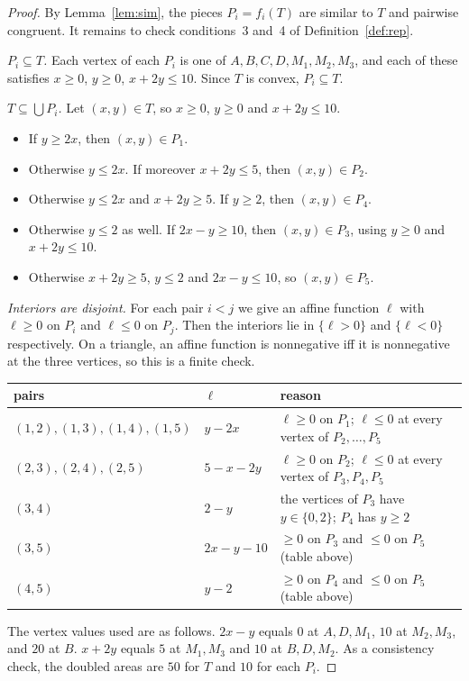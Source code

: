 \documentclass[11pt]{article}
\theoremstyle{definition}
\theoremstyle{remark}
\begin{document}
\begin{proof}
By Lemma~\ref{lem:sim}, the pieces $P_i=f_i(T)$ are similar to $T$ and pairwise
congruent. It remains to check conditions~3 and~4 of Definition~\ref{def:rep}.

\emph{$P_i\subseteq T$.} Each vertex of each $P_i$ is one of $A,B,C,D,M_1,M_2,M_3$, and
each of these satisfies $x\ge0$, $y\ge0$, $x+2y\le10$. Since $T$ is convex, $P_i\subseteq T$.

\emph{$T\subseteq\bigcup P_i$.} Let $(x,y)\in T$, so $x\ge0$, $y\ge0$ and $x+2y\le10$.
\begin{itemize}
\item If $y\ge2x$, then $(x,y)\in P_1$.
\item Otherwise $y\le2x$. If moreover $x+2y\le5$, then $(x,y)\in P_2$.
\item Otherwise $y\le 2x$ and $x+2y\ge5$. If $y\ge2$, then $(x,y)\in P_4$.
\item Otherwise $y\le2$ as well. If $2x-y\ge10$, then $(x,y)\in P_3$, using $y\ge0$ and $x+2y\le10$.
\item Otherwise $x+2y\ge5$, $y\le2$ and $2x-y\le10$, so $(x,y)\in P_5$.
\end{itemize}

\emph{Interiors are disjoint.} For each pair $i<j$ we give an affine function $\ell$ with
$\ell\ge0$ on $P_i$ and $\ell\le0$ on $P_j$. Then the interiors lie in $\{\ell>0\}$ and
$\{\ell<0\}$ respectively. On a triangle, an affine function is nonnegative iff it is
nonnegative at the three vertices, so this is a finite check.
\begin{center}
\begin{tabular}{llp{7.2cm}}
\toprule
pairs & $\ell$ & reason\\
\midrule
$(1,2),(1,3),(1,4),(1,5)$ & $y-2x$ & $\ell\ge0$ on $P_1$; $\ell\le0$ at every vertex of $P_2,\dots,P_5$\\
$(2,3),(2,4),(2,5)$ & $5-x-2y$ & $\ell\ge0$ on $P_2$; $\ell\le0$ at every vertex of $P_3,P_4,P_5$\\
$(3,4)$ & $2-y$ & the vertices of $P_3$ have $y\in\{0,2\}$; $P_4$ has $y\ge2$\\
$(3,5)$ & $2x-y-10$ & $\ge0$ on $P_3$ and $\le0$ on $P_5$ (table above)\\
$(4,5)$ & $y-2$ & $\ge0$ on $P_4$ and $\le0$ on $P_5$ (table above)\\
\bottomrule
\end{tabular}
\end{center}
The vertex values used are as follows. $2x-y$ equals $0$ at $A,D,M_1$, $10$ at
$M_2,M_3$, and $20$ at $B$. $x+2y$ equals $5$ at $M_1,M_3$ and $10$ at $B,D,M_2$. As a
consistency check, the doubled areas are $50$ for $T$ and $10$ for each $P_i$.
\end{proof}
\end{document}

